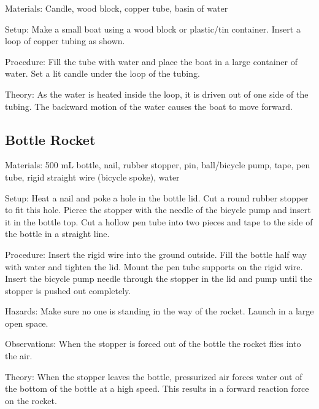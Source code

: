 \begin{multicols}{2}
\begin{description*}
\item[Materials:]{Candle, wood block, copper tube, basin of water}
\item[Setup:]{Make a small boat using a wood block or plastic/tin container. Insert a loop of copper tubing as shown.}
\item[Procedure:]{Fill the tube with water and place the boat in a large container of water. Set a lit candle under the loop of the tubing.}
\item[Theory:]{As the water is heated inside the loop, it is driven out of one side of the tubing. The backward motion of the water causes the boat to move forward.}
\end{description*}

\subsection{Bottle Rocket}


\begin{description*}
\item[Materials:]{500 mL bottle, nail, rubber stopper, pin, ball/bicycle pump, tape, pen tube, rigid straight wire (bicycle spoke), water}
\item[Setup:]{Heat a nail and poke a hole in the bottle lid. Cut a round rubber stopper to fit this hole. Pierce the stopper with the needle of the bicycle pump and insert it in the bottle top. Cut a hollow pen tube into two pieces and tape to the side of the bottle in a straight line.}
\item[Procedure:]{Insert the rigid wire into the ground outside. Fill the bottle half way with water and tighten the lid. Mount the pen tube supports on the rigid wire. Insert the bicycle pump needle through the stopper in the lid and pump until the stopper is pushed out completely.}
\item[Hazards:]{Make sure no one is standing in the way of the rocket. Launch in a large open space.}
\item[Observations:]{When the stopper is forced out of the bottle the rocket flies into the air.}
\item[Theory:]{When the stopper leaves the bottle, pressurized air forces water out of the bottom of the bottle at a high speed. This results in a forward reaction force on the rocket.}
\end{description*}


\end{multicols}

